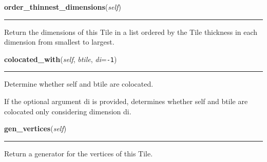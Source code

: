     \label{Tiling:Tile:order_thinnest_dimensions}

    \vspace{0.5ex}

\hspace{.8\funcindent}\begin{boxedminipage}{\funcwidth}

    \raggedright \textbf{order\_thinnest\_dimensions}(\textit{self})

    \vspace{-1.5ex}

    \rule{\textwidth}{0.5\fboxrule}
\setlength{\parskip}{2ex}
    Return the dimensions of this Tile in a list ordered by the Tile 
    thickness in each dimension from smallest to largest.

\setlength{\parskip}{1ex}
    \end{boxedminipage}

    \label{Tiling:Tile:colocated_with}

    \vspace{0.5ex}

\hspace{.8\funcindent}\begin{boxedminipage}{\funcwidth}

    \raggedright \textbf{colocated\_with}(\textit{self}, \textit{btile}, \textit{di}={\tt -1})

    \vspace{-1.5ex}

    \rule{\textwidth}{0.5\fboxrule}
\setlength{\parskip}{2ex}
    Determine whether self and btile are colocated.

    If the optional argument di is provided, determines whether self and 
    btile are colocated only considering dimension di.

\setlength{\parskip}{1ex}
    \end{boxedminipage}

    \label{Tiling:Tile:gen_vertices}

    \vspace{0.5ex}

\hspace{.8\funcindent}\begin{boxedminipage}{\funcwidth}

    \raggedright \textbf{gen\_vertices}(\textit{self})

    \vspace{-1.5ex}

    \rule{\textwidth}{0.5\fboxrule}
\setlength{\parskip}{2ex}
    Return a generator for the vertices of this Tile.

\setlength{\parskip}{1ex}
    \end{boxedminipage}

